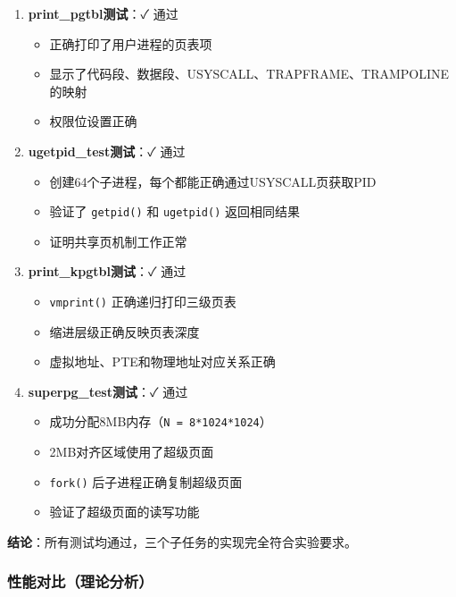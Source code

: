 \begin{enumerate}
    \item \textbf{print\_pgtbl测试}：✓ 通过
    \begin{itemize}
        \item 正确打印了用户进程的页表项
        \item 显示了代码段、数据段、USYSCALL、TRAPFRAME、TRAMPOLINE的映射
        \item 权限位设置正确
    \end{itemize}
    
    \item \textbf{ugetpid\_test测试}：✓ 通过
    \begin{itemize}
        \item 创建64个子进程，每个都能正确通过USYSCALL页获取PID
        \item 验证了 \texttt{getpid()} 和 \texttt{ugetpid()} 返回相同结果
        \item 证明共享页机制工作正常
    \end{itemize}
    
    \item \textbf{print\_kpgtbl测试}：✓ 通过
    \begin{itemize}
        \item \texttt{vmprint()} 正确递归打印三级页表
        \item 缩进层级正确反映页表深度
        \item 虚拟地址、PTE和物理地址对应关系正确
    \end{itemize}
    
    \item \textbf{superpg\_test测试}：✓ 通过
    \begin{itemize}
        \item 成功分配8MB内存（\texttt{N = 8*1024*1024}）
        \item 2MB对齐区域使用了超级页面
        \item \texttt{fork()} 后子进程正确复制超级页面
        \item 验证了超级页面的读写功能
    \end{itemize}
\end{enumerate}

\textbf{结论}：所有测试均通过，三个子任务的实现完全符合实验要求。

\subsubsection{性能对比（理论分析）}

